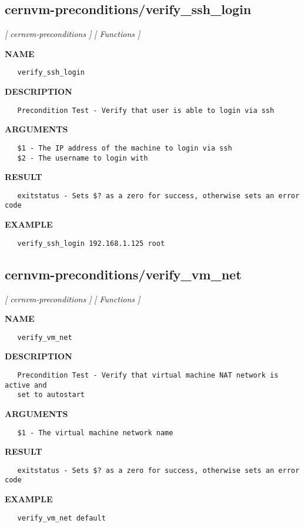 \subsection{cernvm-preconditions/verify\_ssh\_login}
\textsl{[ cernvm-preconditions ]}
\textsl{[ Functions ]}

\label{ch:robo13}
\label{ch:cernvm_preconditions_verify_ssh_login}
\textbf{NAME}
\begin{verbatim}
   verify_ssh_login
\end{verbatim}
\textbf{DESCRIPTION}
\begin{verbatim}
   Precondition Test - Verify that user is able to login via ssh
\end{verbatim}
\textbf{ARGUMENTS}
\begin{verbatim}
   $1 - The IP address of the machine to login via ssh
   $2 - The username to login with
\end{verbatim}
\textbf{RESULT}
\begin{verbatim}
   exitstatus - Sets $? as a zero for success, otherwise sets an error code
\end{verbatim}
\textbf{EXAMPLE}
\begin{verbatim}
   verify_ssh_login 192.168.1.125 root
\end{verbatim}
\newpage
\subsection{cernvm-preconditions/verify\_vm\_net}
\textsl{[ cernvm-preconditions ]}
\textsl{[ Functions ]}

\label{ch:robo14}
\label{ch:cernvm_preconditions_verify_vm_net}
\textbf{NAME}
\begin{verbatim}
   verify_vm_net
\end{verbatim}
\textbf{DESCRIPTION}
\begin{verbatim}
   Precondition Test - Verify that virtual machine NAT network is active and 
   set to autostart
\end{verbatim}
\textbf{ARGUMENTS}
\begin{verbatim}
   $1 - The virtual machine network name
\end{verbatim}
\textbf{RESULT}
\begin{verbatim}
   exitstatus - Sets $? as a zero for success, otherwise sets an error code
\end{verbatim}
\textbf{EXAMPLE}
\begin{verbatim}
   verify_vm_net default
\end{verbatim}
\newpage
